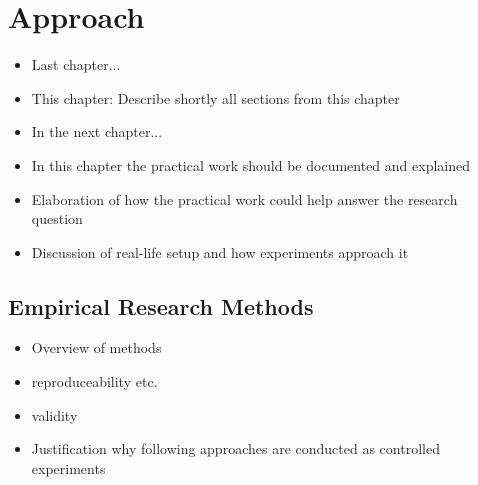 \chapter{Approach}

\begin{itemize}
	\item Last chapter...
	\item This chapter: Describe shortly all sections from this chapter
	\item In the next chapter...
\end{itemize}

\begin{itemize}
\item In this chapter the practical work should be documented and explained
\item Elaboration of how the practical work could help answer the research question
\item Discussion of real-life setup and how experiments approach it
\end{itemize}








\section{Empirical Research Methods}


\begin{itemize}
\item Overview of methods
\item reproduceability etc.
\item validity
\item Justification why following approaches are conducted as controlled experiments
\end{itemize}





